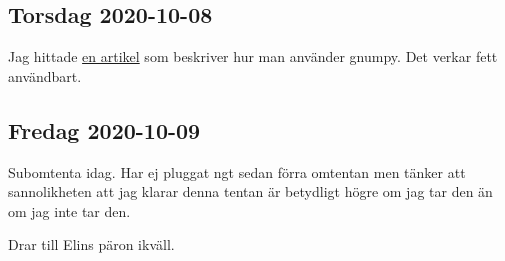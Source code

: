 \subsection{Torsdag 2020-10-08}

Jag hittade \href{http://www.cs.toronto.edu/~tijmen/gnumpyTr.pdf}{\color{blue}en artikel} som beskriver hur man använder gnumpy. Det verkar fett användbart.


\subsection{Fredag 2020-10-09}

Subomtenta idag. Har ej pluggat ngt sedan förra omtentan men tänker att sannolikheten att jag klarar denna tentan är betydligt högre om jag tar den än om jag inte tar den.

Drar till Elins päron ikväll.
